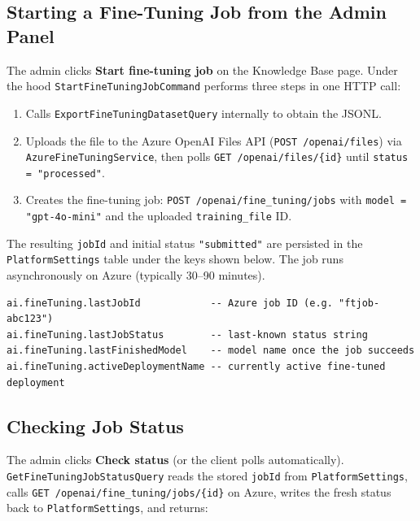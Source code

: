 \documentclass[11pt,a4paper]{article}
\begin{document}
\subsection{Starting a Fine-Tuning Job from the Admin Panel}

The admin clicks \textbf{Start fine-tuning job} on the Knowledge Base page.
Under the hood \texttt{StartFineTuningJobCommand} performs three steps in one
HTTP call:

\begin{enumerate}
  \item Calls \texttt{ExportFineTuningDatasetQuery} internally to obtain the JSONL.
  \item Uploads the file to the Azure OpenAI Files API
        (\texttt{POST /openai/files}) via \texttt{AzureFineTuningService},
        then polls \texttt{GET /openai/files/\{id\}} until \texttt{status = "processed"}.
  \item Creates the fine-tuning job:
        \texttt{POST /openai/fine\_tuning/jobs}
        with \texttt{model = "gpt-4o-mini"} and the uploaded \texttt{training\_file} ID.
\end{enumerate}

The resulting \texttt{jobId} and initial status \texttt{"submitted"} are persisted
in the \texttt{PlatformSettings} table under the keys shown below.
The job runs asynchronously on Azure (typically 30--90 minutes).

\begin{lstlisting}[language={},caption={PlatformSettings keys for fine-tuning state}]
ai.fineTuning.lastJobId            -- Azure job ID (e.g. "ftjob-abc123")
ai.fineTuning.lastJobStatus        -- last-known status string
ai.fineTuning.lastFinishedModel    -- model name once the job succeeds
ai.fineTuning.activeDeploymentName -- currently active fine-tuned deployment
\end{lstlisting}

\subsection{Checking Job Status}

The admin clicks \textbf{Check status} (or the client polls automatically).
\texttt{GetFineTuningJobStatusQuery} reads the stored \texttt{jobId} from
\texttt{PlatformSettings}, calls
\texttt{GET /openai/fine\_tuning/jobs/\{id\}} on Azure,
writes the fresh status back to \texttt{PlatformSettings}, and returns:
\end{document}
